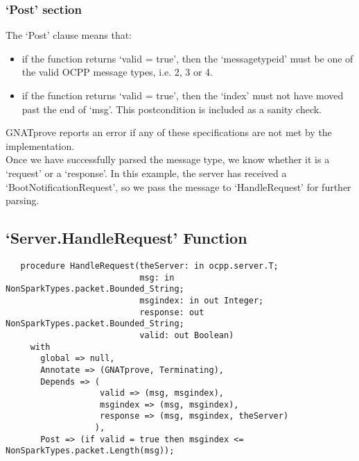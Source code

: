 \documentclass[12pt,openany,a4paper]{book}
\begin{document}
\subsubsection{`Post' section}
The `Post' clause means that:
\begin{itemize}
\item if the function returns `valid = true', then the `messagetypeid' must be one of the valid OCPP message types, i.e. 2, 3 or 4.
\item if the function returns `valid = true', then the `index' must not have moved past the end of `msg'. This postcondition is included as a sanity check. 
\end{itemize}

GNATprove reports an error if any of these specifications are not met by the implementation.\\

Once we have successfully parsed the message type, we know whether it is a `request' or a `response'. In this example, the server has received a `BootNotificationRequest', so we pass the message to `HandleRequest' for further parsing.

\subsection{`Server.HandleRequest' Function}
\begin{verbatim}
   procedure HandleRequest(theServer: in ocpp.server.T;
                           msg: in NonSparkTypes.packet.Bounded_String;
                           msgindex: in out Integer;
                           response: out NonSparkTypes.packet.Bounded_String;
                           valid: out Boolean)
     with
       global => null,
       Annotate => (GNATprove, Terminating),
       Depends => (
                   valid => (msg, msgindex),
                   msgindex => (msg, msgindex),
                   response => (msg, msgindex, theServer)
                  ),
       Post => (if valid = true then msgindex <= NonSparkTypes.packet.Length(msg));
   
\end{verbatim}
\end{document}
